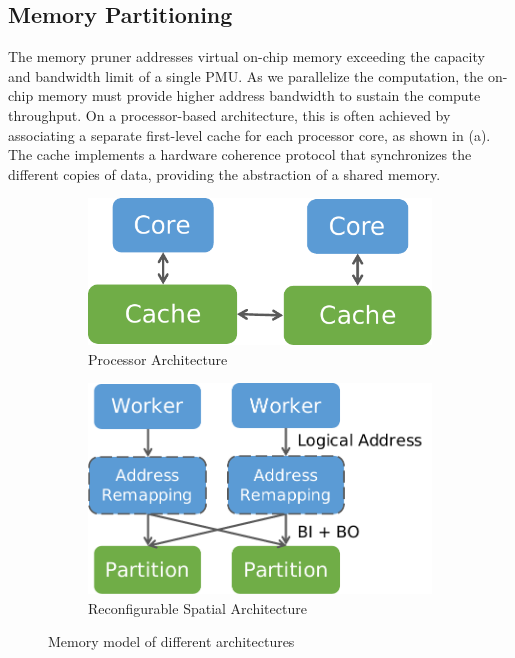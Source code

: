 \subsection{Memory Partitioning} \label{sec:memsplit}
The memory pruner addresses virtual on-chip memory exceeding the capacity and bandwidth limit of a
single PMU.
As we parallelize the computation, the on-chip memory must provide higher address bandwidth to sustain the
compute throughput.
On a processor-based architecture, this is often achieved by associating a separate first-level
cache for each processor core, as shown in  (a).
The cache implements a hardware coherence protocol that synchronizes the different copies of data,
providing the abstraction of a shared memory.

\begin{figure}
  \begin{subfigure}[b]{0.35\textwidth}
  \centering
  \includegraphics[width=1\columnwidth]{figs/cpumemmodel.pdf}
  \caption{Processor Architecture}
  \end{subfigure}
  \hfill
  \begin{subfigure}[b]{0.45\textwidth}
  \centering
  \includegraphics[width=1\columnwidth]{figs/spatialmemmodel.pdf}
  \caption{Reconfigurable Spatial Architecture}
  \end{subfigure}
  \caption[Memory model of different architectures]{Memory model of different architectures}
  \label{fig:memmodel}
\end{figure}

